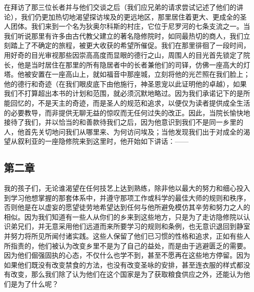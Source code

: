 在拜访了那三位长者并与他们交谈之后（我们应兄弟的请求尝试记述了他们的讲论），我们仍更加热切地渴望探访埃及的更远地区，那里居住着更大、更成全的圣人团体。我们来到一个名为狄奥尔科斯的村庄，它位于尼罗河的七条支流之一。当我们听说那里有许多由古代教父建立的著名隐修院时，如同最热切的商人，我们立刻踏上了不确定的旅程，被更大收获的希望所催促。我们在那里徘徊了一段时间，用好奇的目光审视那些因崇高高度而显眼的德行之山，周围人的目光首先锁定了院长，他是当时居住在那里的所有隐居者中的长者兼他们的司铎，仿佛一座高大的灯塔。他被安置在一座高山上，就如福音中那座城，立刻将他的光芒照在我们脸上；他的德行和奇迹（在我们眼皮底下由他施行，神圣恩宠以此证明他的卓越），如果我们不打算超出本书的计划和范围，就必须沉默地略过。因为我们承诺记下的是所能回忆的，不是天主的奇迹，而是圣人的规范和追求，以便仅为读者提供成全生活的必要教导，而非提供无聊无益的惊叹而无任何过失的改正。因此，当院长愉快地接待了我们，并以恰当的和善款待我们之后，因为他意识到我们不是同一乡里的人，他首先关切地问我们从哪里来、为何访问埃及；当他发现我们出于对成全的渴望从叙利亚的一座隐修院来到这里时，他开始如下讲话：——\par


\subsection{第二章}

\par

我的孩子们，无论谁渴望在任何技艺上达到熟练，除非他以最大的努力和细心投入到学习他想掌握的那套体系中，并遵守那项工作或科学的最佳大师的规则和秩序，否则他是在以虚妄的愿望徒劳地希望达到任何与他所避免模仿其辛劳和努力之人的相似。因为我们知道有一些人从你们的乡来到这些地方，只是为了走访隐修院以认识弟兄们，并无意采用他们远道而来所要学习的规则和条例，也无意识退回到静室并努力将所见所闻付诸实践。这些人保留了他们已习惯的性格和追求，正如有些人所指责的，他们被认为改变乡里不是为了自己的益处，而是由于逃避匮乏的需要。因为他们倔强固执的心态，不仅什么也学不到，甚至不愿再在这些地方停留。因为如果他们既没有改变禁食的方法，也没有改变圣咏的安排，甚至连衣服的样式都没有改变，那么我们除了认为他们在这个国家是为了获取粮食供应之外，还能认为他们是为了什么呢？\par



